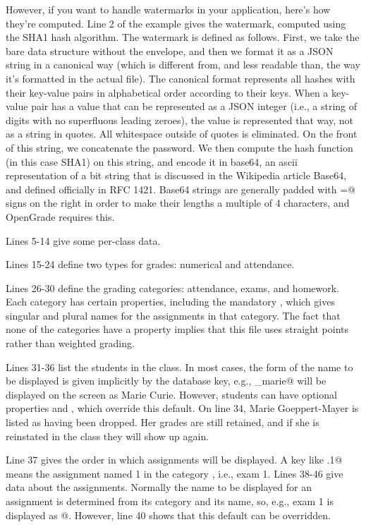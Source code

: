 \documentclass{opengrade_doc}
\begin{document}
However, if you want to handle watermarks in your application, here's how they're computed.
Line 2 of the example gives the watermark, computed using the SHA1 hash algorithm.
The watermark is defined as follows. First, we take the bare data structure
without the envelope, and then we format it as a JSON string in a canonical way (which is different
from, and less readable than, the way it's formatted in the actual file).
The canonical format represents all hashes with their key-value pairs
in alphabetical order according to their keys. When a key-value pair has
a value that can be represented as a JSON integer (i.e., a string of digits
with no superfluous leading zeroes), the value is represented that way, not
as a string in quotes. All whitespace outside of quotes is eliminated.
On the front of this string, we concatenate the password. We then compute the
hash function (in this case SHA1) on this string, and encode it in base64,
an ascii representation of a bit string that is discussed in the Wikipedia
article Base64, and defined officially in RFC 1421.
Base64 strings are generally padded with \verb@=@ signs on the right in order
to make their lengths a multiple of 4 characters, and OpenGrade requires this.

Lines 5-14 give some per-class data.

Lines 15-24 define two types for grades: numerical and attendance.

Lines 26-30 define the grading categories: attendance, exams, and homework.
Each category has certain properties, including the mandatory \verb@catname@,
which gives singular and plural names for the assignments in that category.
The fact that none of the categories have a \verb@weight@ property implies
that this file uses straight points rather than weighted grading.

Lines 31-36 list the students in the class. In most cases, the form of the name
to be displayed is given implicitly by the database key, e.g., \verb@curie_marie@
will be displayed on the screen as Marie Curie. However, students can have
optional properties \verb@first@ and \verb@last@, which override this default.
On line 34, Marie Goeppert-Mayer is listed as having been dropped. Her grades are
still retained, and if she is reinstated in the class they will show up again.

Line 37 gives the order in which assignments will be displayed. A key like
\verb@e.1@ means the assignment named 1 in the category \verb@e@, i.e., exam 1.
Lines 38-46 give data about the assignments. Normally the name to be displayed
for an assignment is determined from its category and its name, so, e.g., exam
1 is displayed as @. However, line 40 shows that this default can
be overridden.
\end{document}
